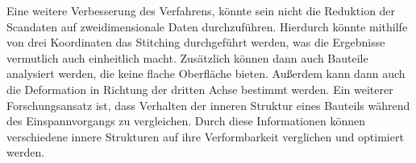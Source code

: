 Eine weitere Verbesserung des Verfahrens, könnte sein nicht die Reduktion der 
Scandaten auf zweidimensionale Daten durchzuführen. 
Hierdurch könnte mithilfe von drei Koordinaten das Stitching durchgeführt werden, 
was die Ergebnisse vermutlich auch einheitlich macht. Zusätzlich können 
dann auch Bauteile analysiert werden, die keine flache Oberfläche bieten.
Außerdem kann dann auch die Deformation in Richtung der dritten Achse bestimmt werden. 
Ein weiterer Forschungsansatz ist, dass Verhalten der inneren Struktur eines Bauteils 
während des Einspannvorgangs zu vergleichen. Durch diese Informationen können 
verschiedene innere Strukturen auf ihre Verformbarkeit verglichen und optimiert werden. 

